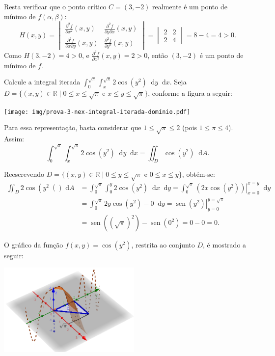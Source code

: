 \documentclass[12pt,a4paper]{article}
\newcommand*\diff{\mathop{}\!\mathrm{d}}
\newcommand*\sen{\operatorname{sen}}
\begin{document}
\begin{ExerciseList}
Resta verificar que o ponto crítico $C = (3, -2)$ realmente é um ponto de mínimo de $f(\alpha, \beta)$:\[
H(x, y) =
\begin{vmatrix}
  \frac{\partial^2 f}{\partial x^2}(x, y) & \frac{\partial^2 f}{\partial y \partial x}(x, y) \\
  \frac{\partial^2 f}{\partial x\partial y}(x, y) & \frac{\partial^2 f}{\partial y^2}(x, y)
\end{vmatrix}
=
\begin{vmatrix}
  2 & 2 \\
  2 & 4
\end{vmatrix}
= 8 - 4 = 4 > 0.
\]
Como $H(3, -2) = 4 > 0$, e $\frac{\partial^2 f}{\partial x^2}(x, y) = 2 > 0$, então $(3, -2)$ é um ponto de mínimo de $f$.


\Exercise[title={2,0}] Calcule a integral iterada $\int_0^{\sqrt{\pi}}\int_{x}^{\sqrt{\pi}} 2\cos\left(y^2\right) \diff{y}\diff{x}$.
\Answer Seja $D	= \{(x, y) \in \mathbb{R} \mid 0 \leq x \leq \sqrt{\pi} \text{ e } x \leq y \leq \sqrt{\pi} \}$, conforme a figura a seguir:

\begin{center}
  \texttt{[image: img/prova-3-nex-integral-iterada-domínio.pdf]}
\end{center}

Para essa representação, basta considerar que $1 \leq \sqrt{\pi} \leq 2$ (pois $1 \leq \pi \leq 4$). Assim:
\[
\int_0^{\sqrt{\pi}}\int_{x}^{\sqrt{\pi}} 2\cos\left(y^2\right) \diff{y}\diff{x}
 = \iint_{D} \cos\left(y^2\right) \diff{A}.
\]

Reescrevendo $D = \{(x, y) \in \mathbb{R} \mid 0 \leq y \leq \sqrt{\pi} \text{ e } 0 \leq x \leq y \}$, obtém-se:
\begin{align*}
\iint_{D} 2\cos\left(y^2\right() \diff{A}
& = \int_0^{\sqrt{\pi}}\int_0^{y} 2\cos\left(y^2\right) \diff{x}\diff{y}
  = \int_0^{\sqrt{\pi}} \left.\left(2x\cos\left(y^2\right)\right)\right|_{x=0}^{x=y}\diff{y} \\
& = \int_0^{\sqrt{\pi}} 2y\cos\left(y^2\right) - 0\diff{y}
  = \left.\sen\left(y^2\right)\right|_{y=0}^{y=\sqrt{\pi}} \\
& = \sen\left(\left(\sqrt{\pi}\right)^2\right) - \sen\left(0^2\right)
  = 0 - 0
  = 0.
\end{align*}

O gráfico da função $f(x,y) = \cos(y^2)$, restrita ao conjunto $D$, é mostrado a seguir:
\begin{center}
  \includegraphics[width=7.0cm]{img/prova-3-nex-integral-iterada.png}
\end{center}


\end{ExerciseList}
\end{document}
